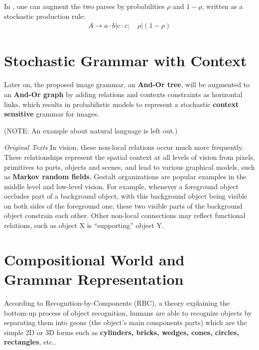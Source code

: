 \documentclass[../Notes_of_CaRiVaC.tex]{subfiles}
\begin{document}
In , one can augment the two parses by probabilities $\rho$ and
$1 - \rho$, written as a stochastic production rule:
%
\begin{align}
  \label{eq:ii.1.14}
  \tag{1.14}
  A \to a \cdot b \vert c \cdot c; \quad \rho \vert (1 - \rho)
\end{align}
%

\section{Stochastic Grammar with Context}%
\label{sec:ii.1.5}
Later on, the proposed image grammar, an \textbf{And-Or tree}, will be
augmented to an \textbf{And-Or graph} by adding relations and contexts
constraints as horizontal links, which results in probabilistic models to
represent a stochastic \textbf{context sensitive} grammar for images.

%

{\color{red} (NOTE\@: An example about natural language is left out.)}

\begin{textbox}{\textit{Original Texts}}
In vision, these non-local relations occur much more frequently. These
relationships represent the spatial context at all levels of vision from
pixels, primitives to parts, objects and scenes, and lead to various graphical
models, such as \textbf{Markov random fields}. Gestalt organizations are
popular examples in the middle level and low-level vision. For example,
whenever a foreground object occludes part of a background object, with this
background object being visible on both sides of the foreground one, these two
visible parts of the background object constrain each other. Other non-local
connections may reflect functional relations, such as object X is
``supporting'' object Y.
\end{textbox}

\section{Compositional World and Grammar Representation}%
\label{sec:ii.1.6}
According to Recognition-by-Components (RBC)\cite{biederman1987}, a theory
explaining the bottom-up process of object recognition, humans are able to
recognize objects by separating them into geons (the object's main components
parts) which are the simple 2D or 3D forms such as \textbf{cylinders, bricks,
wedges, cones, circles, rectangles}, etc..
\end{document}

